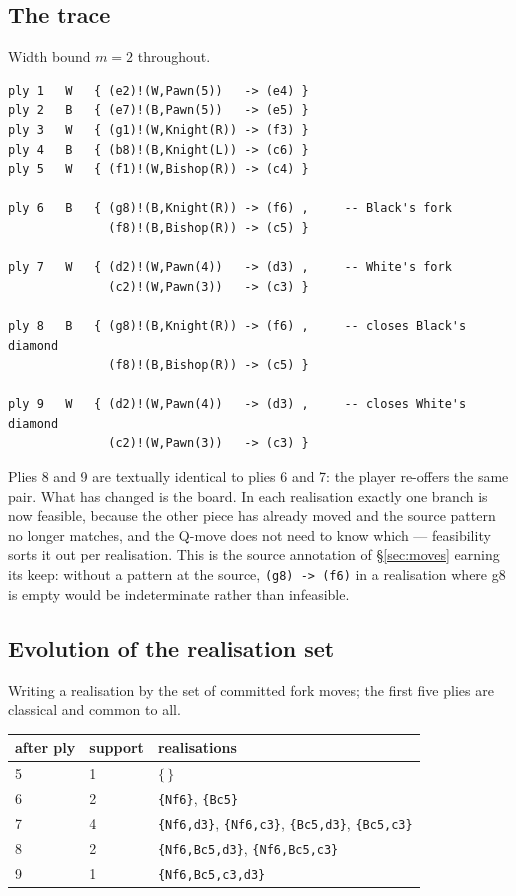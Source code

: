 \documentclass[11pt,a4paper]{article}
\theoremstyle{definition}
\theoremstyle{plain}
\begin{document}
\subsection{The trace}

Width bound $m=2$ throughout.

\begin{lstlisting}
ply 1   W   { (e2)!(W,Pawn(5))   -> (e4) }
ply 2   B   { (e7)!(B,Pawn(5))   -> (e5) }
ply 3   W   { (g1)!(W,Knight(R)) -> (f3) }
ply 4   B   { (b8)!(B,Knight(L)) -> (c6) }
ply 5   W   { (f1)!(W,Bishop(R)) -> (c4) }

ply 6   B   { (g8)!(B,Knight(R)) -> (f6) ,     -- Black's fork
              (f8)!(B,Bishop(R)) -> (c5) }

ply 7   W   { (d2)!(W,Pawn(4))   -> (d3) ,     -- White's fork
              (c2)!(W,Pawn(3))   -> (c3) }

ply 8   B   { (g8)!(B,Knight(R)) -> (f6) ,     -- closes Black's diamond
              (f8)!(B,Bishop(R)) -> (c5) }

ply 9   W   { (d2)!(W,Pawn(4))   -> (d3) ,     -- closes White's diamond
              (c2)!(W,Pawn(3))   -> (c3) }
\end{lstlisting}

Plies 8 and 9 are textually identical to plies 6 and 7: the player re-offers the
same pair. What has changed is the board. In each realisation exactly one branch
is now feasible, because the other piece has already moved and the source
pattern no longer matches, and the Q-move does not need to know which ---
feasibility sorts it out per realisation. This is the source annotation of
\S\ref{sec:moves} earning its keep: without a pattern at the source,
\texttt{(g8) -> (f6)} in a realisation where g8 is empty would be indeterminate
rather than infeasible.

\subsection{Evolution of the realisation set}

Writing a realisation by the set of committed fork moves; the first five plies
are classical and common to all.

\begin{center}
\begin{tabular}{lll}
\toprule
after ply & support & realisations \\
\midrule
5 & 1 & $\{\,\}$ \\
6 & 2 & \texttt{\{Nf6\}}, \texttt{\{Bc5\}} \\
7 & 4 & \texttt{\{Nf6,d3\}}, \texttt{\{Nf6,c3\}}, \texttt{\{Bc5,d3\}}, \texttt{\{Bc5,c3\}} \\
8 & 2 & \texttt{\{Nf6,Bc5,d3\}}, \texttt{\{Nf6,Bc5,c3\}} \\
9 & 1 & \texttt{\{Nf6,Bc5,c3,d3\}} \\
\bottomrule
\end{tabular}
\end{center}
\end{document}
